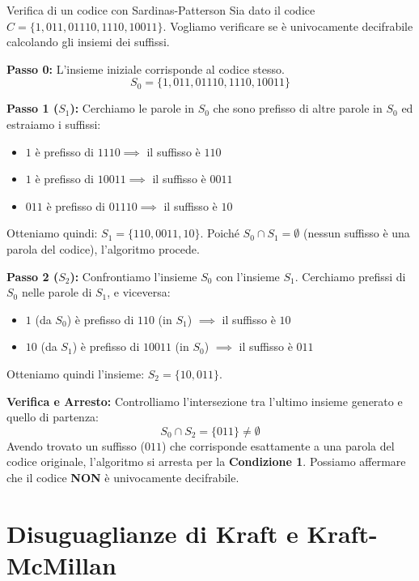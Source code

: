 \begin{esempio}{Verifica di un codice con Sardinas-Patterson}
Sia dato il codice $C = \{1, 011, 01110, 1110, 10011\}$. Vogliamo verificare se è univocamente decifrabile calcolando gli insiemi dei suffissi.

\textbf{Passo 0:} L'insieme iniziale corrisponde al codice stesso.
\[ S_0 = \{1, 011, 01110, 1110, 10011\} \]

\textbf{Passo 1 ($S_1$):} Cerchiamo le parole in $S_0$ che sono prefisso di altre parole in $S_0$ ed estraiamo i suffissi:
\begin{itemize}
    \item $1$ è prefisso di $1110 \implies$ il suffisso è $110$
    \item $1$ è prefisso di $10011 \implies$ il suffisso è $0011$
    \item $011$ è prefisso di $01110 \implies$ il suffisso è $10$
\end{itemize}
Otteniamo quindi: $S_1 = \{110, 0011, 10\}$. 
Poiché $S_0 \cap S_1 = \emptyset$ (nessun suffisso è una parola del codice), l'algoritmo procede.

\textbf{Passo 2 ($S_2$):} Confrontiamo l'insieme $S_0$ con l'insieme $S_1$. Cerchiamo prefissi di $S_0$ nelle parole di $S_1$, e viceversa:
\begin{itemize}
    \item $1$ (da $S_0$) è prefisso di $110$ (in $S_1$) $\implies$ il suffisso è $10$
    \item $10$ (da $S_1$) è prefisso di $10011$ (in $S_0$) $\implies$ il suffisso è $011$
\end{itemize}
Otteniamo quindi l'insieme: $S_2 = \{10, 011\}$.

\textbf{Verifica e Arresto:} 
Controlliamo l'intersezione tra l'ultimo insieme generato e quello di partenza: 
\[ S_0 \cap S_2 = \{011\} \neq \emptyset \]
Avendo trovato un suffisso ($011$) che corrisponde esattamente a una parola del codice originale, l'algoritmo si arresta per la \textbf{Condizione 1}. Possiamo affermare che il codice \textbf{NON} è univocamente decifrabile.
\end{esempio}
\section{Disuguaglianze di Kraft e Kraft-McMillan}

